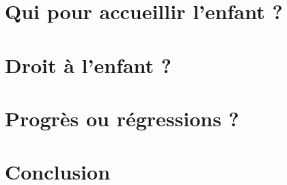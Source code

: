 \documentclass[12pt,french]{book}
\begin{document}
\chapter{Qui pour accueillir l'enfant ?}


\chapter{Droit à l'enfant ?}


\chapter{Progrès ou régressions ?}


\chapter{Conclusion}



\backmatter

\tableofcontents
\end{document}
